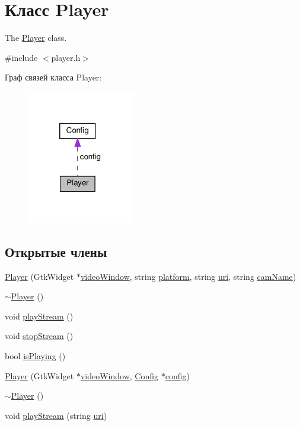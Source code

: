 \hypertarget{class_player}{}\section{Класс Player}
\label{class_player}


The \hyperlink{class_player}{Player} class.  




{\ttfamily \#include $<$player.\+h$>$}



Граф связей класса Player\+:\nopagebreak
\begin{figure}[H]
\begin{center}
\leavevmode
\includegraphics[width=133pt]{class_player__coll__graph}
\end{center}
\end{figure}
\subsection*{Открытые члены}
\begin{DoxyCompactItemize}
\item 
\hyperlink{class_player_a0e17f3ec3397aa056d2ee88a060a7d36}{Player} (Gtk\+Widget $\ast$\hyperlink{class_player_ae5ed3420e43869788a3e9bf4eb29e529}{video\+Window}, string \hyperlink{class_player_a4335f10f38749272bbdee425e8e30388}{platform}, string \hyperlink{class_player_a02eaaec54dce5238f76ef6b9f458c86d}{uri}, string \hyperlink{class_player_af5647b79bedfd422ca8758c90c6bbc45}{cam\+Name})
\item 
\hyperlink{class_player_a749d2c00e1fe0f5c2746f7505a58c062}{$\sim$\+Player} ()
\item 
void \hyperlink{class_player_a082180138fe92098aa9a1f51fd9ad40d}{play\+Stream} ()
\item 
void \hyperlink{class_player_aa8396672dd38d93e1000b7b0f55e9c24}{stop\+Stream} ()
\item 
bool \hyperlink{class_player_a370339dfdf9eb61905637283a72f9e22}{is\+Playing} ()
\item 
\hyperlink{class_player_a4b179b1c59f780f59e215fa5642acb99}{Player} (Gtk\+Widget $\ast$\hyperlink{class_player_ae5ed3420e43869788a3e9bf4eb29e529}{video\+Window}, \hyperlink{class_config}{Config} $\ast$\hyperlink{class_player_a53cd9b524dac60ecacd99f0812c71332}{config})
\item 
\hyperlink{class_player_a749d2c00e1fe0f5c2746f7505a58c062}{$\sim$\+Player} ()
\item 
void \hyperlink{class_player_a75c7257813c5f96bb2d8585dfc0c3025}{play\+Stream} (string \hyperlink{class_player_a02eaaec54dce5238f76ef6b9f458c86d}{uri})
\end{DoxyCompactItemize}
